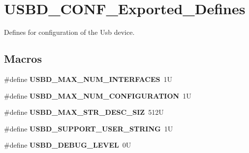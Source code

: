 \hypertarget{group__USBD__CONF__Exported__Defines}{}\section{U\+S\+B\+D\+\_\+\+C\+O\+N\+F\+\_\+\+Exported\+\_\+\+Defines}
\label{group__USBD__CONF__Exported__Defines}


Defines for configuration of the Usb device.  


\subsection*{Macros}
\begin{DoxyCompactItemize}
\item 
\mbox{\label{group__USBD__CONF__Exported__Defines_ga121d6d45e8011e1f372a365986126d0e}} 
\#define {\bfseries U\+S\+B\+D\+\_\+\+M\+A\+X\+\_\+\+N\+U\+M\+\_\+\+I\+N\+T\+E\+R\+F\+A\+C\+ES}~1U
\item 
\mbox{\label{group__USBD__CONF__Exported__Defines_gaef1f76fda5677f5ad43c25a2ba4ebcde}} 
\#define {\bfseries U\+S\+B\+D\+\_\+\+M\+A\+X\+\_\+\+N\+U\+M\+\_\+\+C\+O\+N\+F\+I\+G\+U\+R\+A\+T\+I\+ON}~1U
\item 
\mbox{\label{group__USBD__CONF__Exported__Defines_ga056ff3fee04cffde6a1ccccd566f8682}} 
\#define {\bfseries U\+S\+B\+D\+\_\+\+M\+A\+X\+\_\+\+S\+T\+R\+\_\+\+D\+E\+S\+C\+\_\+\+S\+IZ}~512U
\item 
\mbox{\label{group__USBD__CONF__Exported__Defines_ga7763658489a8c680428bd017dcc38dfd}} 
\#define {\bfseries U\+S\+B\+D\+\_\+\+S\+U\+P\+P\+O\+R\+T\+\_\+\+U\+S\+E\+R\+\_\+\+S\+T\+R\+I\+NG}~1U
\item 
\mbox{\label{group__USBD__CONF__Exported__Defines_gae7364a789408417d945d5ca96679ccf7}} 
\#define {\bfseries U\+S\+B\+D\+\_\+\+D\+E\+B\+U\+G\+\_\+\+L\+E\+V\+EL}~0U
\item 
\mbox{\label{group__USBD__CONF__Exported__Defines_ga61c094d920ba8d41bd826e6d51a3d80e}} 

\end{DoxyCompactItemize}
